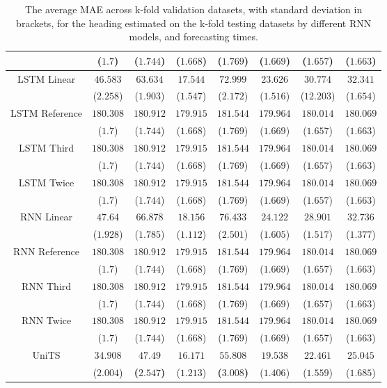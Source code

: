\begin{table}[!ht]
{\begin{tabular}{|c|c|c|c|c|c|c|c|}
			 & ($1.7$) & ($1.744$) & ($1.668$) & ($1.769$) & ($1.669$) & ($1.657$) & ($1.663$) \\ \hline
			\multirow{2}{*}{LSTM Linear} & $46.583$ & $63.634$ & $17.544$ & $72.999$ & $23.626$ & $30.774$ & $32.341$ \\
			 & ($2.258$) & ($1.903$) & ($1.547$) & ($2.172$) & ($1.516$) & ($12.203$) & ($1.654$) \\ \hline
			\multirow{2}{*}{LSTM Reference} & $180.308$ & $180.912$ & $179.915$ & $181.544$ & $179.964$ & $180.014$ & $180.069$ \\
			 & ($1.7$) & ($1.744$) & ($1.668$) & ($1.769$) & ($1.669$) & ($1.657$) & ($1.663$) \\ \hline
			\multirow{2}{*}{LSTM Third} & $180.308$ & $180.912$ & $179.915$ & $181.544$ & $179.964$ & $180.014$ & $180.069$ \\
			 & ($1.7$) & ($1.744$) & ($1.668$) & ($1.769$) & ($1.669$) & ($1.657$) & ($1.663$) \\ \hline
			\multirow{2}{*}{LSTM Twice} & $180.308$ & $180.912$ & $179.915$ & $181.544$ & $179.964$ & $180.014$ & $180.069$ \\
			 & ($1.7$) & ($1.744$) & ($1.668$) & ($1.769$) & ($1.669$) & ($1.657$) & ($1.663$) \\ \hline
			\multirow{2}{*}{RNN Linear} & $47.64$ & $66.878$ & $18.156$ & $76.433$ & $24.122$ & $28.901$ & $32.736$ \\
			 & ($1.928$) & ($1.785$) & ($1.112$) & ($2.501$) & ($1.605$) & ($1.517$) & ($1.377$) \\ \hline
			\multirow{2}{*}{RNN Reference} & $180.308$ & $180.912$ & $179.915$ & $181.544$ & $179.964$ & $180.014$ & $180.069$ \\
			 & ($1.7$) & ($1.744$) & ($1.668$) & ($1.769$) & ($1.669$) & ($1.657$) & ($1.663$) \\ \hline
			\multirow{2}{*}{RNN Third} & $180.308$ & $180.912$ & $179.915$ & $181.544$ & $179.964$ & $180.014$ & $180.069$ \\
			 & ($1.7$) & ($1.744$) & ($1.668$) & ($1.769$) & ($1.669$) & ($1.657$) & ($1.663$) \\ \hline
			\multirow{2}{*}{RNN Twice} & $180.308$ & $180.912$ & $179.915$ & $181.544$ & $179.964$ & $180.014$ & $180.069$ \\
			 & ($1.7$) & ($1.744$) & ($1.668$) & ($1.769$) & ($1.669$) & ($1.657$) & ($1.663$) \\ \hline
			\multirow{2}{*}{UniTS} & $34.908$ & $\mathbf{47.49}$ & $16.171$ & $\mathbf{55.808}$ & $19.538$ & $22.461$ & $25.045$ \\
			 & ($2.004$) & \textbf{(}$\mathbf{2.547}$\textbf{)} & ($1.213$) & \textbf{(}$\mathbf{3.008}$\textbf{)} & ($1.406$) & ($1.559$) & ($1.685$) \\ \hline
		\end{tabular}
	}
	\caption{The average MAE across k-fold validation datasets, with standard deviation in brackets, for the heading estimated on the k-fold testing datasets by different RNN models, and forecasting times.}
	\label{tab:all_direction_MAE}
\end{table}
